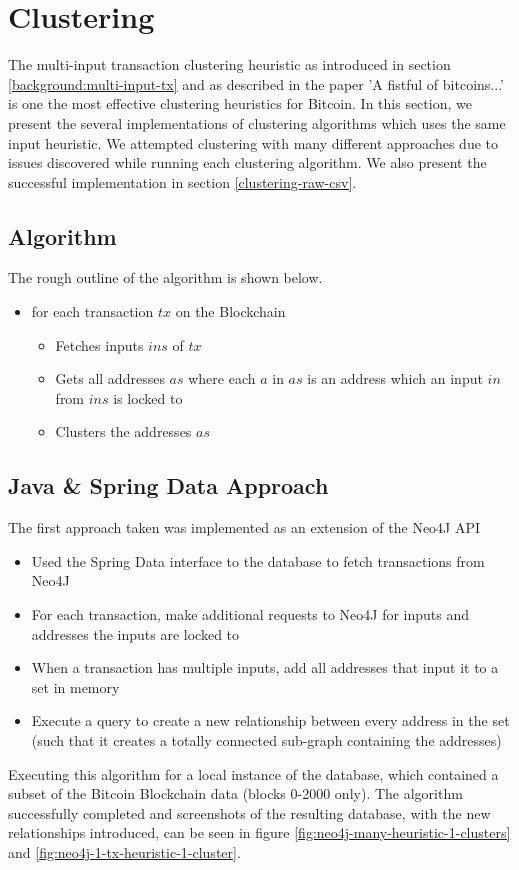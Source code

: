 \chapter{Clustering}\label{section-clustering}

The multi-input transaction clustering heuristic as introduced in section \ref{background:multi-input-tx} and as described in the paper 'A fistful of bitcoins...' \cite{Refworks:doc:5c3de7e3e4b0ea6196452d80} is one the most effective clustering heuristics for Bitcoin. In this section, we present the several implementations of clustering algorithms which uses the same input heuristic. We attempted clustering with many different approaches due to issues discovered while running each clustering algorithm. We also present the successful implementation in section \ref{clustering-raw-csv}.

\section{Algorithm}
The rough outline of the algorithm is shown below.
\begin{itemize}
    \item for each transaction $tx$ on the Blockchain
    \begin{itemize}
        \item Fetches inputs $ins$ of $tx$
        \item Gets all addresses $as$ where each $a$ in $as$ is an address which an input  $in$ from $ins$ is locked to
        \item Clusters the addresses $as$
    \end{itemize}
\end{itemize}

\section{Java \& Spring Data Approach}
The first approach taken was implemented as an extension of the Neo4J API 
\begin{itemize}
    \item Used the Spring Data interface to the database to fetch transactions from Neo4J
    \item For each transaction, make additional requests to Neo4J for inputs and addresses the inputs are locked to
    \item When a transaction has multiple inputs, add all addresses that input it to a set in memory 
    \item Execute a query to create a new relationship between every address in the set (such that it creates a totally connected sub-graph containing the addresses)
\end{itemize}
Executing this algorithm for a local instance of the database, which contained a subset of the Bitcoin Blockchain data (blocks 0-2000 only). The algorithm successfully completed and screenshots of the resulting database, with the new relationships introduced, can be seen in figure \ref{fig:neo4j-many-heuristic-1-clusters} and \ref{fig:neo4j-1-tx-heuristic-1-cluster}. 

